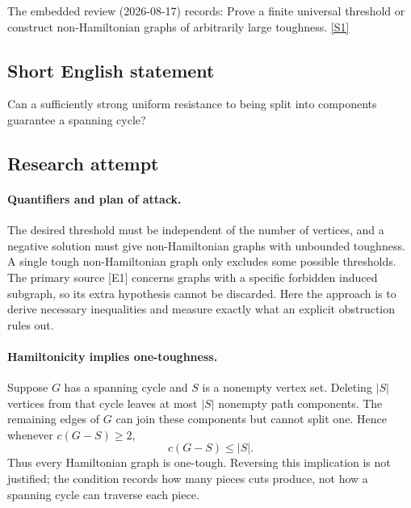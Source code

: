 \documentclass[11pt,a4paper]{article}
\newcommand{\sref}[2]{\hyperlink{source:#1:#2}{[S#2]}}
\begin{document}
The embedded review (2026-08-17) records: Prove a finite universal threshold or construct non-Hamiltonian graphs of arbitrarily large toughness. \sref{statement}{1}

\subsection{Short English statement}

Can a sufficiently strong uniform resistance to being split into components guarantee a spanning cycle?

\subsection{Research attempt}

\paragraph{Quantifiers and plan of attack.}
The desired threshold must be independent of the number of vertices,
and a negative solution must give non-Hamiltonian graphs with unbounded
toughness. A single tough non-Hamiltonian graph only excludes some
possible thresholds. The primary source [E1] concerns graphs with a
specific forbidden induced subgraph, so its extra hypothesis cannot be
discarded. Here the approach is to derive necessary inequalities and
measure exactly what an explicit obstruction rules out.

\paragraph{Hamiltonicity implies one-toughness.}
Suppose $G$ has a spanning cycle and $S$ is a nonempty vertex set.
Deleting $|S|$ vertices from that cycle leaves at most $|S|$ nonempty
path components. The remaining edges of $G$ can join these components
but cannot split one. Hence whenever $c(G-S)\ge2$,
\[
                         c(G-S)\le |S|.
\]
Thus every Hamiltonian graph is one-tough. Reversing this implication
is not justified; the condition records how many pieces cuts produce,
not how a spanning cycle can traverse each piece.
\end{document}
